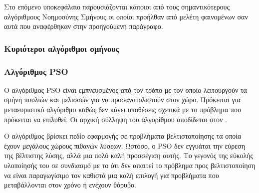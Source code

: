 \documentclass{assignment}
\begin{document}
Στο επόμενο υποκεφάλαιο παρουσιάζονται κάποιοι από τους σημαντικότερους
αλγόριθμους Νοημοσύνης Σμήνους οι οποίοι προήλθαν από μελέτη φαινομένων σαν
αυτά που αναφέρθηκαν στην προηγούμενη παράγραφο.
\subsubsection{Κυριότεροι αλγόριθμοι σμήνους}
\subsubsection*{Αλγόριθμος PSO}
O αλγόριθμος PSO είναι εμπνευσμένος από τον τρόπο με τον οποίο λειτουργούν
τα σμήνη πουλιών και μελισσών για να προσανατολιστούν στον χώρο. Πρόκειται για
μεταευριστικό αλγόριθμο καθώς δεν κάνει υποθέσεις σχετικά με το πρόβλημα που
πρόκειται να επιλυθεί. Οι αρχική σύλληψη του αλγορίθμου αποδίδεται στον \citet{kennedy2010particle}.

Ο αλγόριθμος βρίσκει πεδίο εφαρμογής σε προβλήματα βελτιστοποίησης τα οποία
έχουν μεγάλους χώρους πιθανών λύσεων. Ωστόσο, ο PSO δεν εγγυάται την εύρεση
της βέλτιστης λύσης, αλλά μια πολύ καλή προσσέγιση αυτής. Το γεγονός της εύκολής
υλοποίησής του σε συνδιασμό με το ότι δεν απαιτεί το πρόβλημα προς
βελτιστοποίηση να είναι παραγωγίσιμο \cite{kennedy2010particle} τον καθιστά μια
καλή επιλογή για προβλήματα που μεταβάλλονται στον χρόνο ή ενέχουν θόρυβο.
\end{document}
